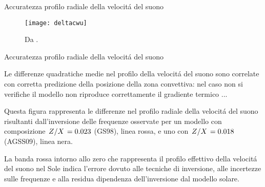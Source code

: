 \documentclass[10pt,xcolor={usenames},fleqn,mathserif,serif]{beamer}
\begin{document}
\begin{frame}{Accuratezza profilo radiale della velocit\'a del suono}

\begin{figure}[!ht]%
        \texttt{[image: deltacwu]}
        \caption{Da \cite{villante2014chemical}.}\label{fig:deltacwu}
\end{figure}

\end{frame}

\begin{wordonframe}{Accuratezza profilo radiale della velocit\'a del suono}

Le differenze quadratiche medie nel profilo della velocit\'a del suono sono  correlate con corretta predizione della posizione della zona convettiva: nel caso non si verifiche il modello non riproduce correttamente il gradiente termico ...

Questa figura rappresenta le differenze nel profilo radiale della velocit\'a del suono risultanti dall'inversione delle frequenze osservate per un modello con composizione $\left.{Z}\middle/{X}\right.=0.023$ (GS98), linea rossa, e uno con $\left.{Z}\middle/{X}\right.=0.018$ (AGSS09), linea nera.

La banda rossa intorno allo zero che rappresenta il profilo effettivo della velocit\'a del suono nel Sole indica l'errore dovuto alle tecniche di inversione, alle incertezze sulle frequenze e alla residua dipendenza dell'inversione dal modello solare.

\end{wordonframe}


%

%

%
\end{document}
